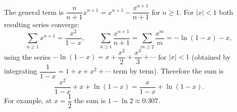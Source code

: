 The general term is $\dfrac{n}{n+1}x^{n+1}=x^{n+1}-\dfrac{x^{n+1}}{n+1}$ for $n\ge1$. For $|x|<1$ both resulting series converge:
\[\sum_{n\ge1}x^{n+1}=\dfrac{x^2}{1-x},\qquad\sum_{n\ge1}\dfrac{x^{n+1}}{n+1}=\sum_{m\ge2}\dfrac{x^m}{m}=-\ln(1-x)-x,\]
using the series $-\ln(1-x)=x+\dfrac{x^2}{2}+\dfrac{x^3}{3}+\cdots$ for $|x|<1$ (obtained by integrating $\dfrac{1}{1-x}=1+x+x^2+\cdots$ term by term). Therefore the sum is
\[\dfrac{x^2}{1-x}+x+\ln(1-x)=\boxed{\dfrac{x}{1-x}+\ln(1-x)}.\]
For example, at $x=\dfrac12$ the sum is $1-\ln2\approx0.307$.
